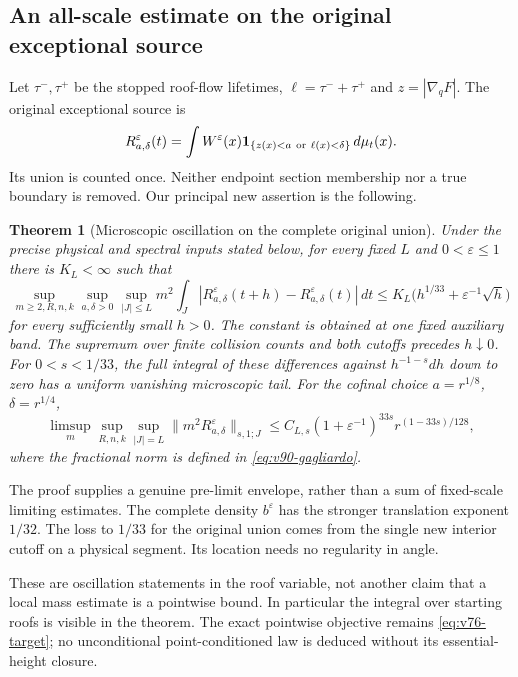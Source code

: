 \documentclass[11pt,reqno]{amsart}
\numberwithin{equation}{section}
\newtheorem{theorem}{Theorem}[section]
\theoremstyle{definition}\newtheorem{definition}[theorem]{Definition}
\theoremstyle{remark}\newtheorem{remark}[theorem]{Remark}
\theoremstyle{definition}\newtheorem{inputstatement}[theorem]{Input statement}
\begin{document}
\subsection{An all-scale estimate on the original exceptional source}
Let $\tau^-,\tau^+$ be the stopped roof-flow lifetimes, $\ell=\tau^-+\tau^+$
and $z=|\nabla_qF|$. The original exceptional source is
\[
 R_{a,\delta}^\varepsilon(t)
   =\int W^\varepsilon(x)\one_{\{z(x)<a\ \mathrm{or}\ \ell(x)<\delta\}}
                                                       \,d\mu_t(x).
\]
Its union is counted once. Neither endpoint section membership nor a
true boundary is removed. Our principal new assertion is the following.
\begin{theorem}[Microscopic oscillation on the complete original union]
\label{thm:v90-main}
Under the precise physical and spectral inputs stated below, for every
fixed $L$ and $0<\varepsilon\le1$ there is $K_L<\infty$ such that
\[
 \sup_{m\ge2,R,n,k}\sup_{a,\delta>0}\sup_{|J|\le L}m^2
 \int_J|R_{a,\delta}^\varepsilon(t+h)-R_{a,\delta}^\varepsilon(t)|\,dt
       \le K_L\bigl(h^{1/33}+\varepsilon^{-1}\sqrt h\bigr)
\]
for every sufficiently small $h>0$. The constant is obtained at one
fixed auxiliary band. The supremum over finite collision counts and
both cutoffs precedes $h\downarrow0$.
For $0<s<1/33$, the full integral of these differences against
$h^{-1-s}dh$ down to zero has a uniform vanishing microscopic tail.
For the cofinal choice $a=r^{1/8}$, $\delta=r^{1/4}$,
\[
 \limsup_m\sup_{R,n,k}\sup_{|J|=L}
 \|m^2R_{a,\delta}^\varepsilon\|_{s,1;J}
             \le C_{L,s}(1+\varepsilon^{-1})^{33s}r^{(1-33s)/128},
\]
where the fractional norm is defined in \eqref{eq:v90-gagliardo}.
\end{theorem}
The proof supplies a genuine pre-limit envelope, rather than a sum of
fixed-scale limiting estimates. The complete density $b^\varepsilon$
has the stronger translation exponent $1/32$. The loss to $1/33$ for
the original union comes from the single new interior cutoff on a
physical segment. Its location needs no regularity in angle.

These are oscillation statements in the roof variable, not another
claim that a local mass estimate is a pointwise bound. In particular the
integral over starting roofs is visible in the theorem. The exact
pointwise objective remains \eqref{eq:v76-target}; no unconditional
point-conditioned law is deduced without its essential-height closure.





\end{document}
